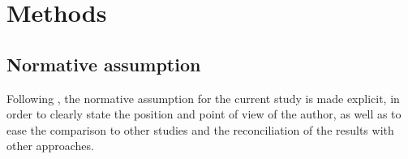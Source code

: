 \chapter{Methods}
\label{c:methods}

\section{Normative assumption}
\label{s:methods:normative-assumption}

Following , the normative assumption for the current study is made explicit, in order to clearly state the position and point of view of the author, as well as to ease the comparison to other studies and the reconciliation of the results with other approaches.

